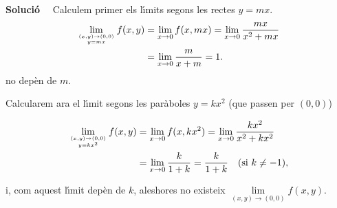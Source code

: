 \documentclass[12pt]{article}
\newcommand{\solucio}{\textbf{Soluci{\'o}}\ \ }
\begin{document}
\solucio
Calculem primer els l{\'\i}mits segons les rectes $y=mx$.
\begin{align*}
\lim_{(x,y)\to (0,0)\atop y=mx} f(x,y)& =  \lim_{x\to 0} f(x,m x)
= \lim_{x\to 0}\frac{mx}{x^2 + m x} \\ & =  \lim_{x\to 0}
\frac{m}{x + m} = 1.
\end{align*}
no dep{\`e}n de $m$.

Calcularem ara el l{\'\i}mit segons les par{\`a}boles $y=k x^2$ (que passen per
$(0,0)$)

\begin{align*}
\lim_{(x,y)\to (0,0)\atop y=kx^2} f(x,y)& =  \lim_{x\to 0} f(x,k
x^2) = \lim_{x\to 0}\frac{k x^2}{x^2 + k x^2} \\ & =  \lim_{x\to
0} \frac{k}{1 + k} = \frac{k}{1+k}\quad (\mbox{si}\,\, k\not=
-1),
\end{align*}

i, com aquest l{\'\i}mit dep{\`e}n de $k$, aleshores no existeix
$\lim\limits_{(x,y)\to (0,0)} f(x,y)$.


%
\end{document}
